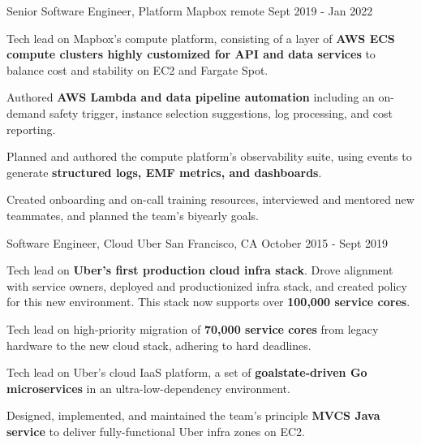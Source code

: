 
\begin{cventries}
  \cventry
    {Senior Software Engineer, Platform}
    {Mapbox}
    {remote}
    {Sept 2019 - Jan 2022}
    {
      \begin{cvitems}
        \item {Tech lead on Mapbox's compute platform, consisting of a layer of \textbf{AWS ECS compute clusters highly customized for API and data services} to balance cost and stability on EC2 and Fargate Spot.} \item {Authored \textbf{AWS Lambda and data pipeline automation} including an on-demand safety trigger, instance selection suggestions, log processing, and cost reporting.}
        \item {Planned and authored the compute platform's observability suite, using events to generate \textbf{structured logs, EMF metrics, and dashboards}.}
        \item {Created onboarding and on-call training resources, interviewed and mentored new teammates, and planned the team's biyearly goals.}
      \end{cvitems}
    }

  \cventry
    {Software Engineer, Cloud}
    {Uber}
    {San Francisco, CA}
    {October 2015 - Sept 2019}
    {
      \begin{cvitems} %
        \item {Tech lead on \textbf{Uber's first production cloud infra stack}. Drove alignment with service owners, deployed and productionized infra stack, and created policy for this new environment.  This stack now supports over \textbf{100,000 service cores}.}
        \item {Tech lead on high-priority migration of \textbf{70,000 service cores} from legacy hardware to the new cloud stack, adhering to hard deadlines.}
        \item {Tech lead on Uber's cloud IaaS platform, a set of \textbf{goalstate-driven Go microservices} in an ultra-low-dependency environment.}
        \item {Designed, implemented, and maintained the team's principle \textbf{MVCS Java service} to deliver fully-functional Uber infra zones on EC2.}
      \end{cvitems}
    }

\end{cventries}

